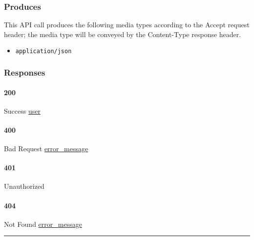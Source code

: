 \hypertarget{produces-147}{%
\subsubsection{Produces}\label{produces-147}}

This API call produces the following media types according to the
{Accept} request header; the media type will be conveyed by the
{Content-Type} response header.

\begin{itemize}
\tightlist
\item
  \texttt{application/json}
\end{itemize}

\hypertarget{responses-152}{%
\subsubsection{Responses}\label{responses-152}}

\hypertarget{section-488}{%
\paragraph{200}\label{section-488}}

Success \protect\hyperlink{user}{user}

\hypertarget{section-489}{%
\paragraph{400}\label{section-489}}

Bad Request \protect\hyperlink{error_message}{error\_message}

\hypertarget{section-490}{%
\paragraph{401}\label{section-490}}

Unauthorized \protect\hyperlink{}{}

\hypertarget{section-491}{%
\paragraph{404}\label{section-491}}

Not Found \protect\hyperlink{error_message}{error\_message}

\begin{center}\rule{0.5\linewidth}{\linethickness}\end{center}

\protect\hypertarget{apiUserUserPut}{}{}


